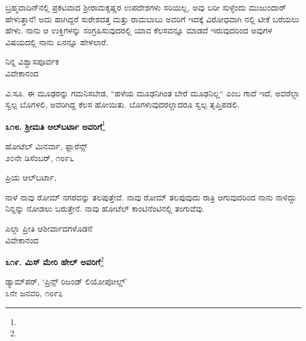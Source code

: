 ಬ್ರಹ್ಮವಾದಿನ್‌ನಲ್ಲಿ ಪ್ರಕಟವಾದ ಶ‍್ರೀರಾಮಕೃಷ್ಣರ ಉಪದೇಶಗಳು ಸರಿಯಿಲ್ಲ, ಅವು ಬರೀ ಸುಳ್ಳೆಂದು ಮುಜುಂದಾರ್ ಹೇಳುತ್ತಾನೆ! ಅದು ಹಾಗಿದ್ದರೆ ಸುರೇಶದತ್ತ ಮತ್ತು ರಾಮಬಾಬು ಅವರಿಗೆ ಇದಕ್ಕೆ ವಿರೋಧವಾಗಿ  ನಲ್ಲಿ ಟೀಕೆ ಬರೆಯಲು ಹೇಳು. ನಾನು ಆ ಉಕ್ತಿಗಳನ್ನು ಸಂಗ್ರಹಿಸುವುದರಲ್ಲಿ ಯಾವ ಕೆಲಸವನ್ನೂ ಮಾಡದೆ ಇರುವುದರಿಂದ ಅವುಗಳ ವಿಷಯದಲ್ಲಿ ನಾನು ಏನನ್ನೂ ಹೇಳಲಾರೆ.

\vspace{-0.5cm}

\begin{flushright}
ನಿನ್ನ ವಿಶ್ವಾಸಪೂರ್ವಕ\\ವಿವೇಕಾನಂದ
\end{flushright}

\vspace{-0.35cm}

ವಿ.ಸೂ.\enginline{-} ಈ ಮೂಢರನ್ನು ಗಮನಿಸಬೇಡ, “ಹಳೆಯ ಮೂಢನಿಗಿಂತ ಬೇರೆ ಮೂಢನಿಲ್ಲ“ ಎಂಬ ಗಾದೆ ಇದೆ, ಅವರೆಲ್ಲಾ ಸ್ವಲ್ಪ ಬೊಗಳಲಿ, ಅವರಿಗಿದ್ದ ಕೆಲಸ ಹೋಯಿತು. ಬೊಗಳುವುದರಲ್ಲಾದರೂ ಸ್ವಲ್ಪ ತೃಪ್ತಿಪಡಲಿ.

\begin{center}
\textbf{೩೧೮. ಶ‍್ರೀಮತಿ ಆಲ್‌ಬರ್ಟಾ ಅವರಿಗೆ}\footnote{}
\end{center}

\vspace{-0.7cm}

\begin{flushright}
ಹೋಟೆಲ್ ಮಿನರ್ವಾ, ಫ್ಲಾರೆನ್ಸ್\\೨೦ನೇ ಡಿಸೆಂಬರ್, ೧೮೯೬
\end{flushright}

\vspace{-0.3cm}

\noindent
ಪ್ರಿಯ ಆಲ್‌ಬರ್ಟಾ,

ನಾಳೆ ನಾವು ರೋಮ್ ನಗರವನ್ನು ತಲಪುತ್ತೇವೆ. ನಾವು ರೋಮ್ ತಲಪುವುದು ರಾತ್ರಿ ಆಗುವುದರಿಂದ ನಾನು ನಾಳಿದ್ದು ನಿನ್ನನ್ನು ನೋಡಲು ಬರುತ್ತೇನೆ. ನಾವು ಹೋಟೆಲ್ ಕಾಂಟಿನೆಂಟಿನಲ್ಲಿ ತಂಗುವೆವು.

\vspace{-0.5cm}

{\flushright
ಎಲ್ಲಾ ಪ್ರೀತಿ ಆಶೀರ್ವಾದಗಳೊಡನೆ\\ವಿವೇಕಾನಂದ\par}

\begin{center}
\textbf{೩೧೯. ಮಿಸ್ ಮೇರಿ ಹೇಲ್‌ ಅವರಿಗೆ}\footnote{}
\end{center}

\vspace{-0.5cm}

\begin{flushright}
ಡ್ಯಾಮ್‌ಪರ್, ‘ಪ್ರಿನ್ಸ್ ರಿಜಂಡ್ ಲಿಯೋಪೋಲ್ಡ್’\\೩ನೇ ಜನವರಿ, ೧೮೯೭
\end{flushright}

